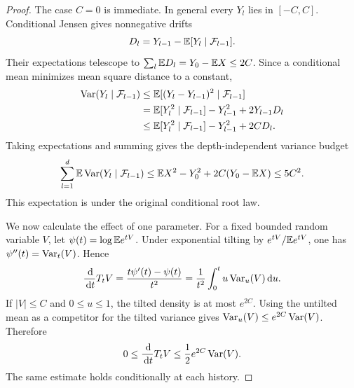 \begin{proof}
The case $C=0$ is immediate. In general every $Y_l$ lies in $[-C,C]$.
Conditional Jensen gives nonnegative drifts
\[
 D_l=Y_{l-1}-\mathbb E[Y_l\mid\mathcal F_{l-1}].
\]
Their expectations telescope to
$\sum_l\mathbb E D_l=Y_0-\mathbb E X\le2C$. Since a conditional mean minimizes mean
square distance to a constant,
\begin{align*}
 \operatorname{Var}(Y_l\mid\mathcal F_{l-1})
 &\le\mathbb E[(Y_l-Y_{l-1})^2\mid\mathcal F_{l-1}]\\
 &=\mathbb E[Y_l^2\mid\mathcal F_{l-1}]-Y_{l-1}^2+2Y_{l-1}D_l\\
 &\le\mathbb E[Y_l^2\mid\mathcal F_{l-1}]-Y_{l-1}^2+2CD_l.
\end{align*}
Taking expectations and summing gives the depth-independent variance
budget
\begin{equation}\label{cs:variance-budget}
 \sum_{l=1}^d\mathbb E\operatorname{Var}(Y_l\mid\mathcal F_{l-1})
 \le\mathbb E X^2-Y_0^2+2C(Y_0-\mathbb E X)\le5C^2.
\end{equation}
This expectation is under the original conditional root law.

We now calculate the effect of one parameter. For a fixed bounded random
variable $V$, let $\psi(t)=\log\mathbb E e^{tV}$. Under exponential tilting by
$e^{tV}/\mathbb E e^{tV}$, one has $\psi''(t)=\operatorname{Var}_t(V)$. Hence
\[
 \frac{\,\mathrm d}{\,\mathrm d t}T_tV
 =\frac{t\psi'(t)-\psi(t)}{t^2}
 =\frac1{t^2}\int_0^t u\operatorname{Var}_u(V)\,\mathrm d u.
\]
If $|V|\le C$ and $0\le u\le1$, the tilted density is at most $e^{2C}$.
Using the untilted mean as a competitor for the tilted variance gives
$\operatorname{Var}_u(V)\le e^{2C}\operatorname{Var}(V)$. Therefore
\begin{equation}\label{cs:local-derivative}
 0\le\frac{\,\mathrm d}{\,\mathrm d t}T_tV\le\frac12e^{2C}\operatorname{Var}(V).
\end{equation}
The same estimate holds conditionally at each history.


\end{proof}
